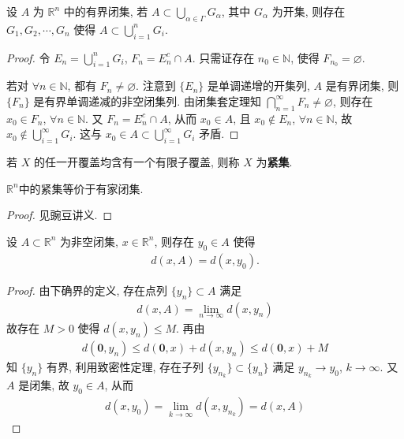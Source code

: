 \documentclass[../../main.tex]{subfiles}
\begin{document}
\begin{theorem}[有限覆盖定理]\label{theorem:有限覆盖定理}
设 $A$ 为 $\mathbb{R}^n$ 中的有界闭集, 若 $A \subset \bigcup_{\alpha \in \varGamma} G_\alpha$, 其中 $G_\alpha$ 为开集, 则存在 $G_1, G_2, \cdots, G_n$ 使得 $A \subset \bigcup_{i = 1}^{n} G_i$.
\end{theorem}
\begin{proof}
令 $E_n = \bigcup_{i = 1}^{n} G_i$, $F_n = E_n^c \cap A$. 只需证存在 $n_0 \in \mathbb{N}$, 使得 $F_{n_0} = \varnothing$.

若对 $\forall n \in \mathbb{N}$, 都有 $F_n \neq \varnothing$. 注意到 $\{E_n\}$ 是单调递增的开集列, $A$ 是有界闭集, 则 $\{F_n\}$ 是有界单调递减的非空闭集列. 由闭集套定理知 $\bigcap_{n = 1}^{\infty} F_n \neq \varnothing$, 则存在 $x_0 \in F_n$, $\forall n \in \mathbb{N}$. 又 $F_n = E_n^c \cap A$, 从而 $x_0 \in A$, 且 $x_0 \notin E_n$, $\forall n \in \mathbb{N}$, 故 $x_0 \notin \bigcup_{i = 1}^{\infty} G_i$. 这与 $x_0 \in A \subset \bigcup_{i = 1}^{\infty} G_i$ 矛盾.
\end{proof}

\begin{definition}[紧集]
若 $X$ 的任一开覆盖均含有一个有限子覆盖, 则称 $X$ 为\textbf{紧集}.
\end{definition}

\begin{theorem}\label{theorem:mathbb{R}^n中的紧集等价于有家闭集.}
$\mathbb{R}^n$中的紧集等价于有家闭集.
\end{theorem}
\begin{proof}
见豌豆讲义.
\end{proof}

\begin{theorem}
设 $A \subset \mathbb{R}^n$ 为非空闭集, $x \in \mathbb{R}^n$, 则存在 $y_0 \in A$ 使得
\begin{align*}
d(x, A) = d(x, y_0).
\end{align*}
\end{theorem}
\begin{proof}
由下确界的定义, 存在点列 $\{y_n\} \subset A$ 满足
\begin{align*}
d(x, A) = \lim_{n \to \infty} d(x, y_n)
\end{align*}
故存在 $M > 0$ 使得 $d(x, y_n) \leqslant M$. 再由
\begin{align*}
d(\mathbf{0}, y_n) \leqslant d(\mathbf{0}, x) + d(x, y_n) \leqslant d(\mathbf{0}, x) + M
\end{align*}
知 $\{y_n\}$ 有界, 利用致密性定理, 存在子列 $\{y_{n_k}\} \subset \{y_n\}$ 满足 $y_{n_k} \to y_0$, $k \to \infty$. 又 $A$ 是闭集, 故 $y_0 \in A$, 从而
\begin{align*}
d(x, y_0) = \lim_{k \to \infty} d(x, y_{n_k}) = d(x, A)
\end{align*}
\end{proof}
\end{document}
